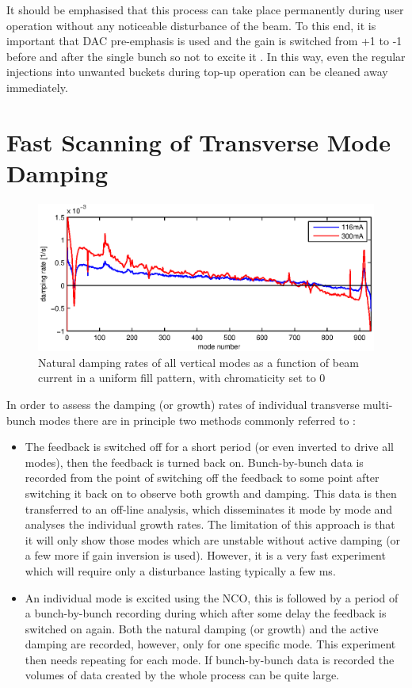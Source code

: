 \documentclass[a4paper]{jacow}
\begin{document}
It should be emphasised that this process can take place permanently during user operation without any noticeable disturbance of the beam. To this end, it is important that DAC pre-emphasis  is used and the gain is switched from +1 to -1 before and after the single bunch so not to excite it \cite{capabilities}. In this way, even the regular injections into unwanted buckets during top-up operation can be cleaned away immediately.


\section{Fast Scanning of Transverse Mode Damping}
\begin{figure}%
\includegraphics[width=\linewidth]{WEPD24_f3.eps}
\caption{Natural damping rates of all vertical modes as a function of beam current in a uniform fill pattern, with chromaticity set to 0}
\label{grow-damp}
\end{figure}
In order to assess the damping (or growth) rates of individual transverse multi-bunch modes there are in principle two methods commonly referred to  \cite{teytelman,prabhakar}:
\begin{itemize}
\item The feedback is switched off for a short period (or even inverted to drive all modes), then the feedback is turned back on.  Bunch-by-bunch data is recorded from the point of switching off the feedback to some point after switching it back on to observe both growth and damping. This data is then transferred to an off-line analysis, which disseminates it mode by mode and analyses the individual growth rates. The limitation of this approach is that it will only show those modes which are unstable without active damping (or a few more if gain inversion is used). However, it is a very fast experiment which will require only a disturbance lasting typically a few ms.
\item An individual mode is excited using the NCO, this is followed by a period of a bunch-by-bunch recording during which after some delay the feedback is switched on again. Both the natural damping (or growth) and the active damping are recorded, however, only for one specific mode. This experiment then needs repeating for each mode. If bunch-by-bunch data is recorded the volumes of data created by the whole process can be quite large.
\end{itemize}
\end{document}

